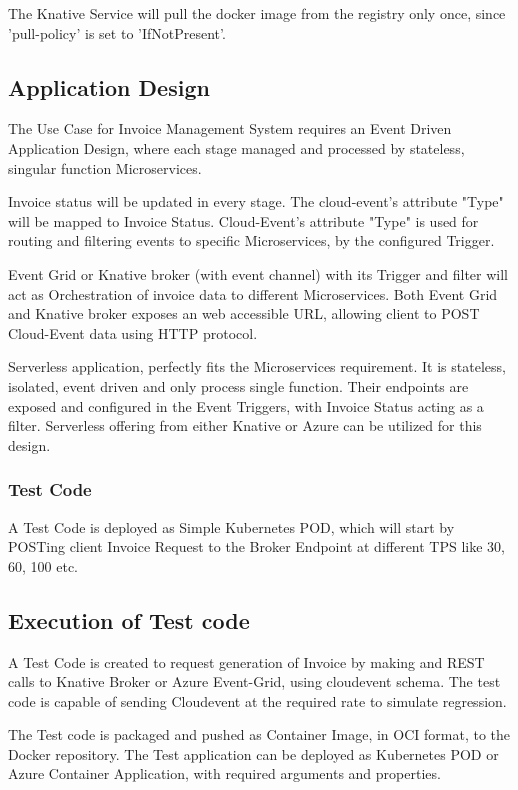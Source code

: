 \documentclass{article}
\begin{document}
\begin{flushleft}
The Knative Service will pull the docker image from the registry only once, since 'pull-policy' is set to '\gls{IfNotPresent}'. 

\subsection{Application Design}
The Use Case for Invoice Management System requires an Event Driven Application Design, where each stage managed and processed by stateless, singular function Microservices. 
 \par
Invoice status will be updated in every stage. The cloud-event's attribute "Type" will be mapped to Invoice Status. Cloud-Event's attribute "Type" is used for routing and filtering events to specific Microservices, by the configured Trigger.
\par
Event Grid or Knative broker (with event channel) with its Trigger and filter will act as Orchestration of invoice data to different Microservices. Both Event Grid and Knative broker exposes an web accessible URL, allowing client to POST Cloud-Event data using \gls{HTTP} protocol.
\par
Serverless application, perfectly fits the Microservices requirement. It is stateless, isolated, event driven and only process single function. Their endpoints are exposed and configured in the Event Triggers, with Invoice Status acting as a filter. 
\hfill\break
Serverless offering from either Knative or Azure can be utilized for this design.

\subsubsection{Test Code}
A Test Code is deployed as Simple Kubernetes \gls{POD}, which will start by POSTing client Invoice Request to the Broker Endpoint at different \gls{TPS} like 30, 60, 100 etc.

\subsection{Execution of Test code}
A Test Code is created to request generation of Invoice by making and REST calls to Knative Broker or Azure Event-Grid, using cloudevent schema. The test code is capable of sending Cloudevent at the required rate to simulate regression. 
\par
The Test code is packaged and pushed as Container Image, in \gls{OCI} format, to the Docker repository. The Test application can be deployed as Kubernetes \gls{POD} or Azure Container Application, with required arguments and properties.
\end{flushleft}
\pagebreak
\end{document}
